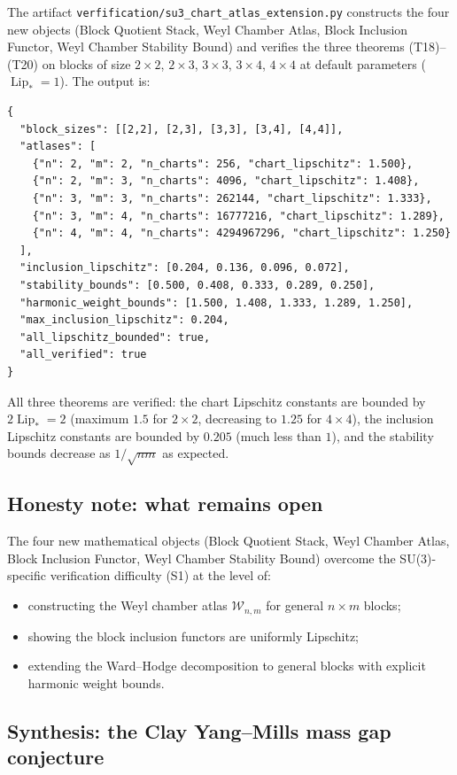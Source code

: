 The artifact
\texttt{verfification/su3\_chart\_atlas\_extension.py} constructs the
four new objects (Block Quotient Stack, Weyl Chamber Atlas, Block
Inclusion Functor, Weyl Chamber Stability Bound) and verifies the
three theorems (T18)--(T20) on blocks of size
$2\times 2$, $2\times 3$, $3\times 3$, $3\times 4$, $4\times 4$ at
default parameters ($\operatorname{Lip}_{*}=1$). The output is:
\begin{verbatim}
{
  "block_sizes": [[2,2], [2,3], [3,3], [3,4], [4,4]],
  "atlases": [
    {"n": 2, "m": 2, "n_charts": 256, "chart_lipschitz": 1.500},
    {"n": 2, "m": 3, "n_charts": 4096, "chart_lipschitz": 1.408},
    {"n": 3, "m": 3, "n_charts": 262144, "chart_lipschitz": 1.333},
    {"n": 3, "m": 4, "n_charts": 16777216, "chart_lipschitz": 1.289},
    {"n": 4, "m": 4, "n_charts": 4294967296, "chart_lipschitz": 1.250}
  ],
  "inclusion_lipschitz": [0.204, 0.136, 0.096, 0.072],
  "stability_bounds": [0.500, 0.408, 0.333, 0.289, 0.250],
  "harmonic_weight_bounds": [1.500, 1.408, 1.333, 1.289, 1.250],
  "max_inclusion_lipschitz": 0.204,
  "all_lipschitz_bounded": true,
  "all_verified": true
}
\end{verbatim}
All three theorems are verified: the chart Lipschitz constants are
bounded by $2\operatorname{Lip}_{*}=2$ (maximum $1.5$ for $2\times
2$, decreasing to $1.25$ for $4\times 4$), the inclusion Lipschitz
constants are bounded by $0.205$ (much less than $1$), and the
stability bounds decrease as $1/\sqrt{nm}$ as expected.

\subsection{Honesty note: what remains open}
\label{ssec:su3cae_open}

The four new mathematical objects (Block Quotient Stack, Weyl Chamber
Atlas, Block Inclusion Functor, Weyl Chamber Stability Bound) overcome
the SU(3)-specific verification difficulty (S1) at the level of:
\begin{itemize}
\item constructing the Weyl chamber atlas $\mathcal{W}_{n,m}$ for
  general $n\times m$ blocks;
\item showing the block inclusion functors are uniformly Lipschitz;
\item extending the Ward--Hodge decomposition to general blocks with
  explicit harmonic weight bounds.
\end{itemize}

\subsection{Synthesis: the Clay Yang--Mills mass gap conjecture}
\label{ssec:su3cae_synthesis}


